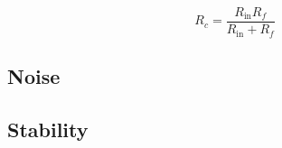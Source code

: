 \cite[p.~57]{Jung05}
\cite[p.~25]{Graeme96}

\begin{equation}
	R_c=\frac{R_\text{in}R_f}{R_\text{in}+R_f}
\end{equation}


\subsection{Noise}

\subsection{Stability}

\cite[p.~693]{Hobbs11}
\cite[p.~183]{Kay12}
\cite[Ch.~5]{Carter17}
\cite[Ch.~3]{Graeme96}